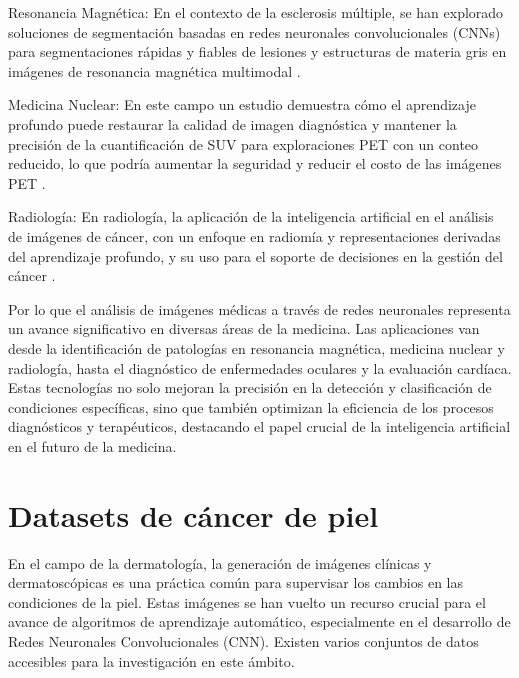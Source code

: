\begin{description}   
    \item Resonancia Magnética: En el contexto de la esclerosis múltiple, se han explorado soluciones de segmentación basadas en redes neuronales convolucionales (CNNs) para segmentaciones rápidas y fiables de lesiones y estructuras de materia gris en imágenes de resonancia magnética multimodal .
    
    \item Medicina Nuclear:  En este campo un estudio demuestra cómo el aprendizaje profundo puede restaurar la calidad de imagen diagnóstica y mantener la precisión de la cuantificación de SUV para exploraciones PET con un conteo reducido, lo que podría aumentar la seguridad y reducir el costo de las imágenes PET .
    
    \item Radiología: En radiología, la aplicación de la inteligencia artificial en el análisis de imágenes de cáncer, con un enfoque en radiomía y representaciones derivadas del aprendizaje profundo, y su uso para el soporte de decisiones en la gestión del cáncer .
\end{description}

Por lo que el análisis de imágenes médicas a través de redes neuronales representa un avance significativo en diversas áreas de la medicina. Las aplicaciones van desde la identificación de patologías en resonancia magnética, medicina nuclear y radiología, hasta el diagnóstico de enfermedades oculares y la evaluación cardíaca. Estas tecnologías no solo mejoran la precisión en la detección y clasificación de condiciones específicas, sino que también optimizan la eficiencia de los procesos diagnósticos y terapéuticos, destacando el papel crucial de la inteligencia artificial en el futuro de la medicina.

\section{Datasets de cáncer de piel}

En el campo de la dermatología, la generación de imágenes clínicas y dermatoscópicas es una práctica común para supervisar los cambios en las condiciones de la piel. Estas imágenes se han vuelto un recurso crucial para el avance de algoritmos de aprendizaje automático, especialmente en el desarrollo de Redes Neuronales Convolucionales (CNN). Existen varios conjuntos de datos accesibles para la investigación en este ámbito.

